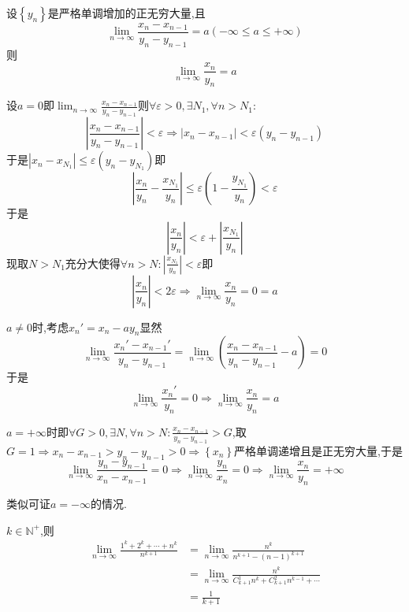 \begin{formal}
    \begin{theorem}[Stolz定理]\label{thm:Stolz定理}
        设$\left\{y_n\right\}$是严格单调增加的正无穷大量,且\[
        \lim_{n\to\infty}   \frac{
            x_n-x_{n-1}
        }{y_n-y_{n-1}}=a\left(
            -\infty\leqslant a\leqslant +\infty
        \right)
        \]则\[
        \lim_{n\to\infty}\frac{x_n}{y_n}=a
        \]
    \end{theorem}
    \begin{Proof}
        设$a=0$即$\displaystyle \lim_{n\to\infty}\frac{
            x_n-x_{n-1}
        }{y_n-y_{n-1}}$则$\forall\varepsilon>0,\exists N_1,\forall n>N_1:$\[
        \left|
            \frac{
                x_n-x_{n-1}
            }{y_n-y_{n-1}}
        \right|<\varepsilon\Longrightarrow \left|x_n-x_{n-1}\right|<\varepsilon\left(y_n-y_{n-1}\right)
        \]于是$\left|x_n-x_{N_1}\right|\leqslant\varepsilon\left(y_n-y_{N_1}\right)$即\[
        \left|
            \frac{x_n}{y_n}-\frac{x_{N_1}}{y_n}
        \right|\leqslant\varepsilon\left(1-\frac{y_{N_1}}{y_n}\right)<\varepsilon
        \]于是\[
        \left|
            \frac{x_n}{y_n}
        \right|<\varepsilon+\left|
            \frac{x_{N_1}}{y_{n}}
        \right|
        \]现取$N>N_1$充分大使得$\forall n>N:\displaystyle \left|\frac{x_{N_1}}{y_n}\right|<\varepsilon$即\[
        \left|\frac{x_n}{y_n}\right|<2\varepsilon\Longrightarrow \lim_{n\to\infty}\frac{x_n}{y_n}=0=a
        \]

        $a\neq0$时,考虑$x_n'=x_n-ay_n$显然\[
        \lim_{n\to\infty}\frac{
            x_n'-x_{n-1}'
        }{
            y_n-y_{n-1}
        }=\lim_{n\to\infty}\left(
            \frac{x_n-x_{n-1}}{y_n-y_{n-1}}-a
        \right)=0
        \]于是\[
        \lim_{n\to\infty}\frac{x_n'}{y_n}=0\Longrightarrow \lim_{n\to\infty}\frac{x_n}{y_n}=a
        \]

        $a=+\infty$时即$\displaystyle \forall G>0,\exists N,\forall n>N:\frac{x_n-x_{n-1}}{y_n-y_{n-1}}>G$,取$G=1\Longrightarrow x_n-x_{n-1}>y_n-y_{n-1}>0\Longrightarrow\left\{x_n\right\}$严格单调递增且是正无穷大量,于是\[
        \lim_{n\to\infty}\frac{y_n-y_{n-1}}{x_n-x_{n-1}}=0\Longrightarrow \lim_{n\to\infty}\frac{y_n}{x_n}=0\Longrightarrow \lim_{n\to\infty}\frac{x_n}{y_n}=+\infty
        \]

        类似可证$a=-\infty$的情况.
    \end{Proof}
\end{formal}
\begin{brown}
    \begin{example}
        $k\in\mathbb{N}^+$,则
        \begin{align}
            \lim_{n\to\infty}\frac{1^k+2^k+\cdots+n^k}{n^{k+1}}&=\lim_{n\to\infty}\frac{n^k}{n^{k+1}-\left(n-1\right)^{k+1}}\\
            &=\lim_{n\to\infty}\frac{n^k}{
                C^1_{k+1}n^{k}+C^2_{k+1}n^{k-1}+\cdots
            }\\
            &=\frac{1}{k+1}
        \end{align}
    \end{example}
\end{brown}